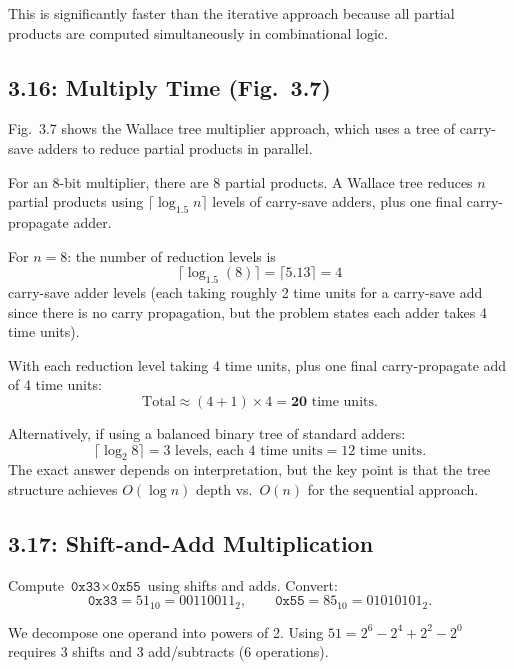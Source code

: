 This is significantly faster than the iterative approach because all partial
products are computed simultaneously in combinational logic.

\subsection*{3.16: Multiply Time (Fig.~3.7)}
\hypertarget{sol-3.16}{}

Fig.~3.7 shows the Wallace tree multiplier approach, which uses a tree of
carry-save adders to reduce partial products in parallel.

For an 8-bit multiplier, there are 8 partial products. A Wallace tree reduces
$n$ partial products using $\lceil \log_{1.5} n \rceil$ levels of carry-save
adders, plus one final carry-propagate adder.

For $n = 8$: the number of reduction levels is
\[
  \lceil \log_{1.5}(8) \rceil = \lceil 5.13 \rceil = 4
\]
carry-save adder levels (each taking roughly 2 time units for a carry-save add
since there is no carry propagation, but the problem states each adder takes 4
time units).

With each reduction level taking 4 time units, plus one final
carry-propagate add of 4 time units:
\[
  \text{Total} \approx (4 + 1) \times 4 = \mathbf{20} \text{ time units.}
\]

Alternatively, if using a balanced binary tree of standard adders:
\[
  \lceil \log_2 8 \rceil = 3 \text{ levels, each 4 time units} = 12 \text{ time units.}
\]
The exact answer depends on interpretation, but the key point is that the tree
structure achieves $O(\log n)$ depth vs.\ $O(n)$ for the sequential approach.

\subsection*{3.17: Shift-and-Add Multiplication}
\hypertarget{sol-3.17}{}

Compute $\texttt{0x33} \times \texttt{0x55}$ using shifts and adds. Convert:
\[
  \texttt{0x33} = 51_{10} = 00110011_2, \qquad
  \texttt{0x55} = 85_{10} = 01010101_2.
\]

We decompose one operand into powers of 2. Using $51 = 2^6 - 2^4 + 2^2 - 2^0$
requires 3 shifts and 3 add/subtracts (6 operations).

